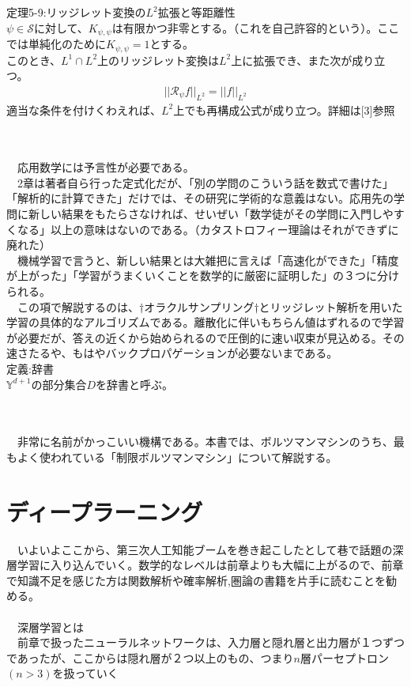 \documentclass{jsarticle}
\begin{document}
定理5-9:リッジレット変換の$L^2$拡張と等距離性\\
$\psi\in\mathcal{S}$に対して、$K_{\psi,\psi}$は有限かつ非零とする。（これを自己許容的という）。ここでは単純化のために$K_{\psi,\psi}=1$とする。\\
このとき、$L^1\cap L^2$上のリッジレット変換は$L^2$上に拡張でき、また次が成り立つ。
\begin{eqnarray}
||\mathcal{R}_\psi f||_{L^2}=||f||_{L^2}
\end{eqnarray}
適当な条件を付けくわえれば、$L^2$上でも再構成公式が成り立つ。詳細は[3]参照

　\\
\scalebox{1.1}{4.積分表現理論を応用した学習高速化}\\
　応用数学には予言性が必要である。\\
　2章は著者自ら行った定式化だが、「別の学問のこういう話を数式で書けた」「解析的に計算できた」だけでは、その研究に学術的な意義はない。応用先の学問に新しい結果をもたらさなければ、せいぜい「数学徒がその学問に入門しやすくなる」以上の意味はないのである。（カタストロフィー理論はそれができずに廃れた）\\
　機械学習で言うと、新しい結果とは大雑把に言えば「高速化ができた」「精度が上がった」「学習がうまくいくことを数学的に厳密に証明した」の３つに分けられる。\\
　この項で解説するのは、$\dag$オラクルサンプリング$\dag$とリッジレット解析を用いた学習の具体的なアルゴリズムである。離散化に伴いもちらん値はずれるので学習が必要だが、答えの近くから始められるので圧倒的に速い収束が見込める。その速さたるや、もはやバックプロパゲーションが必要ないまである。\\
定義:辞書\\
$\mathbb{Y}^{d+1}$の部分集合$D$を辞書と呼ぶ。

　\\
\scalebox{1.1}{4.ボルツマンマシン}\\
　非常に名前がかっこいい機構である。本書では、ボルツマンマシンのうち、最もよく使われている「制限ボルツマンマシン」について解説する。

\newpage
\section{ディープラーニング}
　いよいよここから、第三次人工知能ブームを巻き起こしたとして巷で話題の深層学習に入り込んでいく。数学的なレベルは前章よりも大幅に上がるので、前章で知識不足を感じた方は関数解析や確率解析,圏論の書籍を片手に読むことを勧める。\\
　\\
　深層学習とは\\
　前章で扱ったニューラルネットワークは、入力層と隠れ層と出力層が１つずつであったが、ここからは隠れ層が２つ以上のもの、つまり$n$層パーセプトロン$(n>3)$を扱っていく\\
\end{document}
